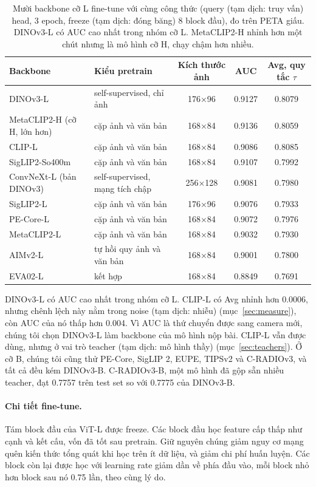\documentclass[11pt,a4paper]{article}
\begin{document}
\begin{table}[H]
\centering\small
\begin{tabular}{@{}llccc@{}}
\toprule
Backbone & Kiểu pretrain & Kích thước ảnh & AUC & Avg, quy tắc $\tau$ \\
\midrule
DINOv3-L & self-supervised, chỉ ảnh & 176×96 & 0.9127 & 0.8079 \\
MetaCLIP2-H (cỡ H, lớn hơn) & cặp ảnh và văn bản & 168×84 & 0.9136 & 0.8059 \\
CLIP-L & cặp ảnh và văn bản & 168×84 & 0.9086 & 0.8085 \\
SigLIP2-So400m & cặp ảnh và văn bản & 168×84 & 0.9107 & 0.7992 \\
ConvNeXt-L (bản DINOv3) & self-supervised, mạng tích chập & 256×128 & 0.9081 & 0.7980 \\
SigLIP2-L & cặp ảnh và văn bản & 176×96 & 0.9076 & 0.7933 \\
PE-Core-L & cặp ảnh và văn bản & 168×84 & 0.9072 & 0.7976 \\
MetaCLIP2-L & cặp ảnh và văn bản & 168×84 & 0.9032 & 0.7930 \\
AIMv2-L & tự hồi quy ảnh và văn bản & 168×84 & 0.9001 & 0.7800 \\
EVA02-L & kết hợp & 168×84 & 0.8849 & 0.7691 \\
\bottomrule
\end{tabular}
\caption{Mười backbone cỡ L fine-tune với cùng công thức (query (tạm dịch: truy vấn) head, 3 epoch, freeze (tạm dịch: đóng băng) 8 block đầu), đo trên PETA giấu. DINOv3-L có AUC cao nhất trong nhóm cỡ L. MetaCLIP2-H nhỉnh hơn một chút nhưng là mô hình cỡ H, chạy chậm hơn nhiều.}
\label{tab:encoders}
\end{table}

DINOv3-L có AUC cao nhất trong nhóm cỡ L. CLIP-L có Avg nhỉnh hơn 0.0006, nhưng chênh lệch này nằm trong noise (tạm dịch: nhiễu) (mục~\ref{sec:measure}), còn AUC của nó thấp hơn 0.004. Vì AUC là thứ chuyển được sang camera mới, chúng tôi chọn DINOv3-L làm backbone của mô hình nộp bài. CLIP-L vẫn được dùng, nhưng ở vai trò teacher (tạm dịch: mô hình thầy) (mục~\ref{sec:teachers}). Ở cỡ B, chúng tôi cũng thử PE-Core, SigLIP 2, EUPE, TIPSv2 và C-RADIOv3, và tất cả đều kém DINOv3-B. C-RADIOv3-B, một mô hình đã gộp sẵn nhiều teacher, đạt 0.7757 trên test set so với 0.7775 của DINOv3-B.

\paragraph{Chi tiết fine-tune.} Tám block đầu của ViT-L được freeze. Các block đầu học feature cấp thấp như cạnh và kết cấu, vốn đã tốt sau pretrain. Giữ nguyên chúng giảm nguy cơ mạng quên kiến thức tổng quát khi học trên ít dữ liệu, và giảm chi phí huấn luyện. Các block còn lại được học với learning rate giảm dần về phía đầu vào, mỗi block nhỏ hơn block sau nó 0.75 lần, theo cùng lý do.
\end{document}
